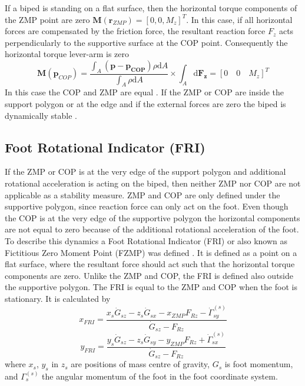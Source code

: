\documentclass[12pt,a4paper,twoside]{article}
\newcommand{\vvc}[1]{{\bm{#1}}}
\begin{document}
If a biped is standing on a flat surface, then the horizontal torque components of the ZMP point are zero $\vvc M(\bm{r}_{ZMP}) = \left[0, 0, M_z \right]^T$. In this case, if all horizontal forces are compensated by the friction force, the resultant reaction force $F_{z}$ acts perpendicularly to the supportive surface at the COP point. Consequently the horizontal torque lever-arm is zero
\begin{equation}
\bm{M}(\bm{p}_{COP})= \frac{\int_A (\bm{p} - \bm{p_{COP}}) \rho \mathrm{d}A}{\int_A \rho \mathrm{d}A} \times \int_A \mathrm{d}\bm{F_{z}} = [0 \quad 0 \quad M_{z}]^{T}
\label{e11}
\end{equation}
In this case the COP and ZMP are equal \cite{Goswami1999,Popovic2005}. If the ZMP or COP are inside the support polygon or at the edge and if the external forces are zero the biped is dynamically stable \cite{Vukobratovic1969,Huang2001,Arakawa1997}.


\subsection{Foot Rotational Indicator (FRI)}
If the ZMP or COP is at the very edge of the support polygon and additional rotational acceleration is acting on the biped, then neither ZMP nor COP are not applicable as a stability measure. ZMP and COP are only defined under the supportive polygon, since reaction force can only act on the foot. Even though the COP is at the very edge of the supportive polygon the horizontal components are not equal to zero because of the additional rotational acceleration of the foot. To describe this dynamics a Foot Rotational Indicator (FRI) or also known as Fictitious Zero Moment Point (FZMP) was defined \cite{Vukobratovic2004}. It is defined as a point on a flat surface, where the resultant force should act such that the horizontal torque components are zero. Unlike the ZMP and COP, the FRI is defined also outside the supportive polygon. The FRI is equal to the ZMP and COP when the foot is stationary. It is calculated by
\begin{equation}
x_{FRI} = \frac{x_{s}\dot{G}_{sz} - z_{s}\dot{G}_{sx} - x_{ZMP}F_{Rz} - \dot{\Gamma}_{sy}^{(s)}} {\dot{G}_{sz} - F_{Rz}}
\label{e12}
\end{equation}
\begin{equation}
y_{FRI} = \frac{y_{s}\dot{G}_{sz} - z_{s}\dot{G}_{sy} - y_{ZMP}F_{Rz} + \dot{\Gamma}_{sx}^{(s)}} {\dot{G}_{sz} - F_{Rz}}
\label{e13}
\end{equation}
where $x_s$, $y_s$ in $z_s$ are positions of mass centre of gravity, $G_s$ is foot momentum, and $\Gamma_s^{(s)}$ the angular momentum of the foot in the foot coordinate system. 
\end{document}
